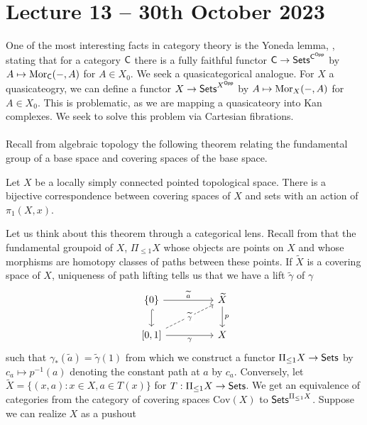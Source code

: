 \section{Lecture 13 -- 30th October 2023}
One of the most interesting facts in category theory is the Yoneda lemma, , stating that for a category $\mathsf{C}$ there is a fully faithful functor $\mathsf{C}\to\mathsf{Sets}^{\mathsf{C}^{\mathsf{Opp}}}$ by $A\mapsto\mathrm{Mor}_{\mathsf{C}}(-,A)$ for $A\in X_{0}$. We seek a quasicategorical analogue. For $X$ a quasicateogry, we can define a functor $X\to \mathsf{Sets}^{X^{\mathsf{Opp}}}$ by $A\mapsto\mathrm{Mor}_{X}(-,A)$ for $A\in X_{0}$. This is problematic, as we are mapping a quasicateory into Kan complexes. We seek to solve this problem via Cartesian fibrations. 
\\\\
Recall from algebraic topology the following theorem relating the fundamental group of a base space and covering spaces of the base space. 
\begin{theorem}
    Let $X$ be a locally simply connected pointed topological space. There is a bijective correspondence between covering spaces of $X$ and sets with an action of $\pi_{1}(X,x)$. 
\end{theorem}
Let us think about this theorem through a categorical lens. Recall from  that the fundamental groupoid of $X$, $\Pi_{\leq 1}X$ whose objects are points on $X$ and whose morphisms are homotopy classes of paths between these points. If $\widetilde{X}$ is a covering space of $X$, uniqueness of path lifting tells us that we have a lift $\widetilde{\gamma}$ of $\gamma$ 
$$%
\begin{tikzcd}
	{\{0\}} && {\widetilde{X}} \\
	{[0,1]} && X
	\arrow["\gamma"', from=2-1, to=2-3]
	\arrow["p", from=1-3, to=2-3]
	\arrow[hook, from=1-1, to=2-1]
	\arrow["{\widetilde{a}}", from=1-1, to=1-3]
	\arrow["{\widetilde{\gamma}}"{description}, dashed, from=2-1, to=1-3]
\end{tikzcd}$$
such that $\gamma_{*}(\widetilde{a})=\widetilde{\gamma}(1)$ from which we construct a functor $\Pi_{\leq1}X\to\mathsf{Sets}$ by $c_{a}\mapsto p^{-1}(a)$ denoting the constant path at $a$ by $c_{a}$. Conversely, let $\widetilde{X}=\{(x,a):x\in X, a\in T(x)\}$ for $T:\Pi_{\leq 1}X\to\mathsf{Sets}$. We get an equivalence of categories from the category of covering spaces $\mathrm{Cov}(X)$ to $\mathsf{Sets}^{\Pi_{\leq 1}X}$. Suppose we can realize $X$ as a pushout 
